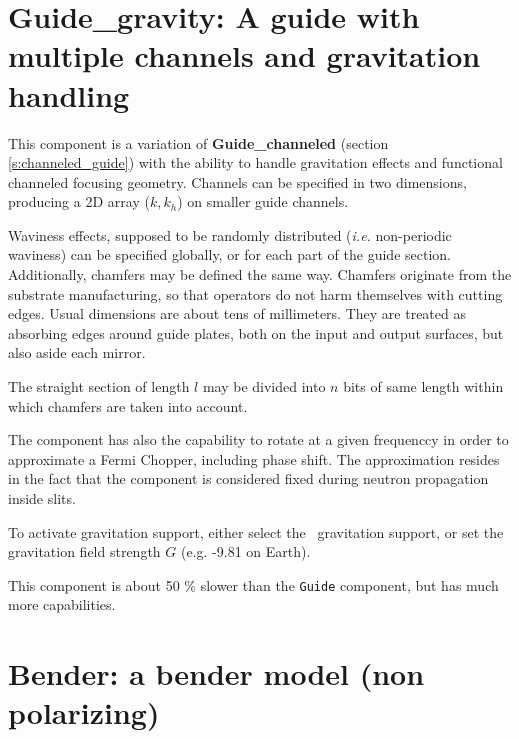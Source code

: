 \section{Guide\_gravity: A guide with multiple channels and gravitation handling}
\label{s:guide_gravity}


This component is a variation of {\bf Guide\_channeled}
(section \ref{s:channeled_guide}) with the ability to handle
gravitation effects and functional channeled focusing geometry.
Channels can be specified in two dimensions,
producing a 2D array ($k, k_h$) on smaller guide channels.

Waviness effects, supposed to be randomly distributed
(\emph{i.e.} non-periodic waviness)
can be specified globally, or for each part of the guide section.
Additionally, chamfers
may be defined the same way.
Chamfers originate from the substrate manufacturing, so that operators do not harm themselves with cutting edges. Usual dimensions are about tens of millimeters. They are treated as absorbing edges around guide plates, both on the input and output surfaces, but also aside each mirror.

The straight section of length $l$ may be divided into $n$ bits of same length
within which chamfers are taken into account.

The component has also the capability to rotate at a given frequenccy in order to approximate a Fermi Chopper, including phase shift. The approximation resides in the fact that the component is considered fixed during neutron propagation inside slits.

To activate gravitation support, either select the \MCS\ gravitation support,
or set the gravitation field strength $G$ (e.g. -9.81 on Earth).

This component is about 50 \% slower than the \verb+Guide+ component, but has much more capabilities.

\section{Bender: a bender model (non polarizing)}



